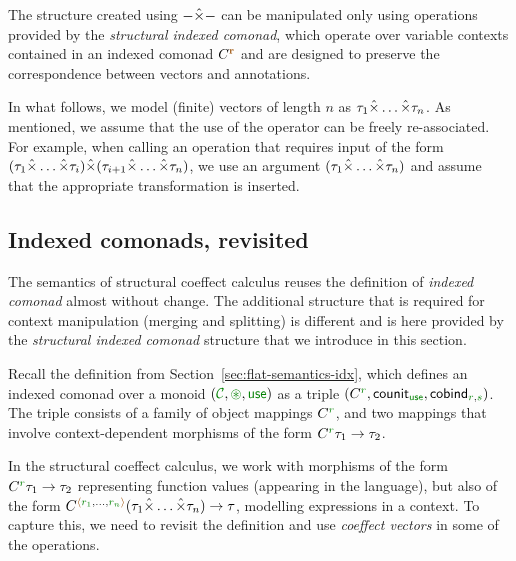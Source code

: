 The structure created using $-\hat{\times}-$ can be manipulated only using operations provided by
the \emph{structural indexed comonad}, which operate over variable contexts contained in an 
indexed comonad $\ctyp{\aclrd{\textbf{r}}}$ and are designed to preserve the correspondence
between vectors and annotations.

In what follows, we model (finite) vectors of length $n$ as $\tau_1 \hat{\times} \ldots \hat{\times} \tau_n$.
As mentioned, we assume that the use of the operator can be freely re-associated. For example, when
calling an operation that requires input of the form 
$(\tau_1 \hat{\times} \ldots \hat{\times} \tau_i) \hat{\times} (\tau_{i+1} \hat{\times} \ldots \hat{\times} \tau_n)$,
we use an argument $(\tau_1 \hat{\times} \ldots \hat{\times} \tau_n)$ and assume that the 
appropriate transformation is inserted.


\subsection{Indexed comonads, revisited}

The semantics of structural coeffect calculus reuses the definition of \emph{indexed comonad} almost
without change. The additional structure that is required for context manipulation (merging and 
splitting) is different and is here provided by the \emph{structural indexed comonad} structure that 
we introduce in this section.

Recall the definition from Section~\ref{sec:flat-semantics-idx}, which defines an indexed como\-nad 
over a monoid $(\C, \cseq, \cunit)$ as a triple $(\ctyp{\cclrd{r}{}}, \ident{counit}_{\cunit}, 
\ident{cobind}_{\cclrd{r}, \cclrd{s}})$. The triple consists of a family of object mappings $\ctyp{\cclrd{r}{}}$,
and two mappings that involve context-dependent morphisms of the form $\ctyp{\cclrd{r}} \tau_1 \rightarrow \tau_2$.

In the structural coeffect calculus, we work with morphisms of the form $\ctyp{\cclrd{r}} \tau_1 \rightarrow \tau_2$
representing function values (appearing in the language), but also of the form
$\ctyp{\alift{\cclrd{r_1},\ldots,\cclrd{r_n}}}{(\tau_1 \xtimes \ldots \xtimes \tau_n)} \rightarrow \tau$, 
modelling expressions in a context. To capture this, we need to revisit the definition and use 
\emph{coeffect vectors} in some of the operations.

